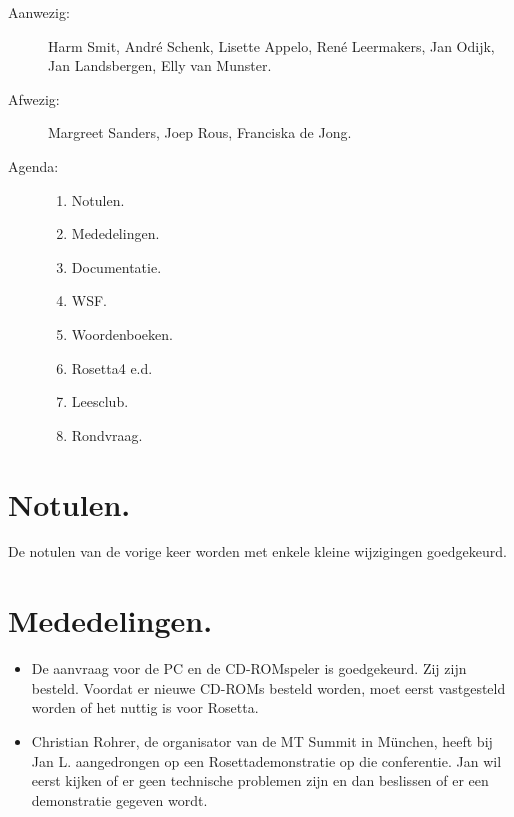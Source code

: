 
   \RosSupersedes{-}
   \MakeRosTitle
%
%
\begin{description}
\item[Aanwezig:] Harm Smit, Andr\'{e} Schenk,
                 Lisette Appelo, Ren\'{e} Leermakers, 
                 Jan Odijk, Jan Landsbergen, Elly van Munster. 

\item[Afwezig:]  Margreet Sanders, Joep Rous, Franciska de Jong.

\item[Agenda:]\mbox{}
  \begin{enumerate}
  \item Notulen.
  \item Mededelingen.
  \item Documentatie.
  \item WSF.
  \item Woordenboeken.
  \item Rosetta4 e.d.
  \item Leesclub.
  \item Rondvraag.
  \end{enumerate}
\end{description}

\section{Notulen.}
De notulen van de vorige keer worden met enkele kleine wijzigingen goedgekeurd.

\section{Mededelingen.}
\begin{itemize}
  \item De aanvraag voor de PC en de CD-ROMspeler is goedgekeurd. Zij zijn
besteld. Voordat er nieuwe CD-ROMs besteld worden, moet eerst vastgesteld
worden of het nuttig is voor Rosetta. 
  \item Christian Rohrer, de organisator van de MT Summit in M\"{u}nchen, heeft 
bij Jan L. aangedrongen op een Rosettademonstratie op die conferentie. Jan wil 
eerst kijken of er geen technische problemen zijn en dan beslissen of er een 
demonstratie gegeven wordt.
\end{itemize}


